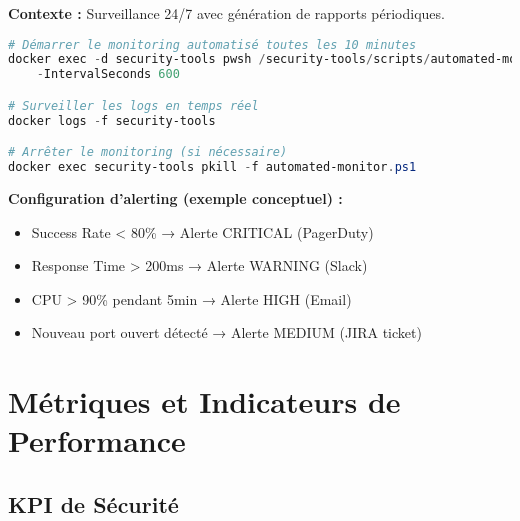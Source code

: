 \documentclass[11pt,a4paper]{report}
\begin{document}
\textbf{Contexte :} Surveillance 24/7 avec génération de rapports périodiques.

\begin{lstlisting}[language=PowerShell, caption=Lancement du Monitoring Continu]
# Démarrer le monitoring automatisé toutes les 10 minutes
docker exec -d security-tools pwsh /security-tools/scripts/automated-monitor.ps1 `
    -IntervalSeconds 600

# Surveiller les logs en temps réel
docker logs -f security-tools

# Arrêter le monitoring (si nécessaire)
docker exec security-tools pkill -f automated-monitor.ps1
\end{lstlisting}

\textbf{Configuration d'alerting (exemple conceptuel) :}
\begin{itemize}
    \item Success Rate < 80\% → Alerte CRITICAL (PagerDuty)
    \item Response Time > 200ms → Alerte WARNING (Slack)
    \item CPU > 90\% pendant 5min → Alerte HIGH (Email)
    \item Nouveau port ouvert détecté → Alerte MEDIUM (JIRA ticket)
\end{itemize}


\chapter{Métriques et Indicateurs de Performance}

\section{KPI de Sécurité}
\end{document}
